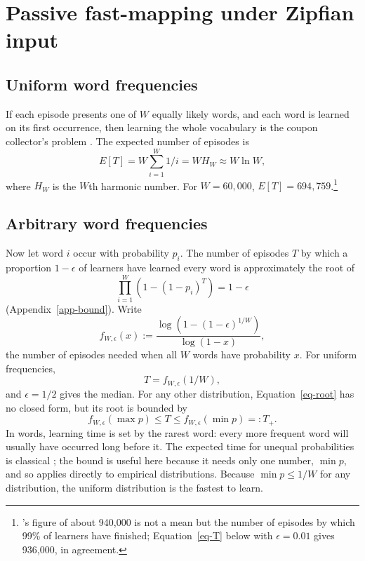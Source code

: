 \documentclass[a4paper,natbib,man]{apa6}
\begin{document}
\section{Passive fast-mapping under Zipfian input}
\label{sec-fastmap}

\subsection{Uniform word frequencies}
If each episode presents one of $W$ equally likely words, and each word is learned on its first occurrence, then learning the whole vocabulary is the coupon collector's problem \citep{Blom1994}. The expected number of episodes is
\begin{equation}
\label{eq-fastmap-T}
 E[T] = W \sum_{i=1}^{W} 1/i = W H_W \approx W \ln W,
\end{equation}
where $H_W$ is the $W$th harmonic number. For $W=60{,}000$, $E[T] = 694{,}759$.\footnote{\cite{Blythe:2010}'s figure of about 940,000 is not a mean but the number of episodes by which 99\% of learners have finished; Equation~\ref{eq-T} below with $\epsilon=0.01$ gives 936,000, in agreement.}

\subsection{Arbitrary word frequencies}
Now let word $i$ occur with probability $p_i$. The number of episodes $T$ by which a proportion $1-\epsilon$ of learners have learned every word is approximately the root of
\begin{equation}
\label{eq-root}
\prod_{i=1}^{W}\left( 1 - ( 1 - p_{i} )^{T} \right) = 1 - \epsilon
\end{equation}
(Appendix~\ref{app-bound}). Write
\[
 f_{W, \epsilon}( x ) := \frac{\log\left( 1 - ( 1 - \epsilon )^{1/W} \right)}{\log\left( 1 - x \right)},
\]
the number of episodes needed when all $W$ words have probability $x$. For uniform frequencies,
\begin{equation}
\label{eq-T}
 T = f_{W, \epsilon}( 1/W ),
\end{equation}
and $\epsilon = 1/2$ gives the median. For any other distribution, Equation~\ref{eq-root} has no closed form, but its root is bounded by
\begin{equation}
f_{W, \epsilon}( \max p ) \le T \le f_{W, \epsilon}( \min p ) =: T_{+}.
\label{eq-Tbound}
\end{equation}
In words, learning time is set by the rarest word: every more frequent word will usually have occurred long before it. The expected time for unequal probabilities is classical \citep{Flajolet:1992,Boneh:1997}; the bound is useful here because it needs only one number, $\min p$, and so applies directly to empirical distributions. Because $\min p \le 1/W$ for any distribution, the uniform distribution is the fastest to learn.
\end{document}
